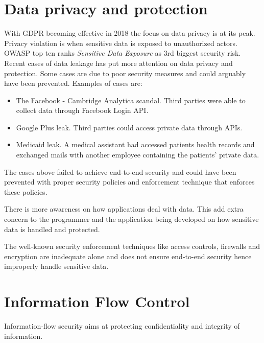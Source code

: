 \section{Data privacy and protection}

With GDPR becoming effective in 2018 the focus on data privacy is at its peak. 
Privacy violation is when sensitive data is exposed to unauthorized actors. OWASP top ten ranks \emph{Sensitive Data Exposure} as 3rd biggest security risk. Recent cases of data leakage has put more attention on data privacy and protection. Some cases are due to poor security measures and could arguably have been prevented. Examples of cases are:

\begin{itemize}
	\item The Facebook - Cambridge Analytica scandal. Third parties were able to collect data through Facebook Login API.
	\item Google Plus leak. Third parties could access private data through APIs.
	\item Medicaid leak. A medical assistant had accessed patients health records and exchanged mails with another employee containing the patients' private data.  
\end{itemize}



The cases above failed to achieve end-to-end security and could have been prevented with proper security policies and enforcement technique that enforces these policies.

There is more awareness on how applications deal with data. This add extra concern to the programmer and the application being developed on how sensitive data is handled and protected.  

The well-known security enforcement techniques like access controls, firewalls and encryption are inadequate alone and does not ensure end-to-end security hence improperly handle sensitive data.








\section{Information Flow Control} %
Information-flow security aims at protecting confidentiality and integrity of information.

